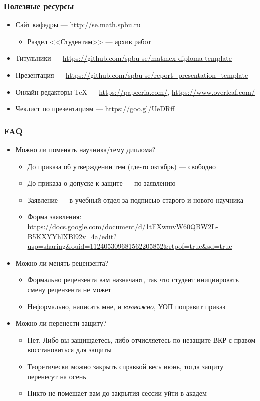 \documentclass[xetex,mathserif,serif]{beamer}
\begin{document}
    \begin{frame}
        \frametitle{Полезные ресурсы}
        \begin{itemize}
            \item Сайт кафедры --- \url{http://se.math.spbu.ru}
            \begin{itemize}
                \item Раздел <<Студентам>> --- архив работ
            \end{itemize}
            \item Титульники --- \url{https://github.com/spbu-se/matmex-diploma-template}
            \item Презентация --- \url{https://github.com/spbu-se/report_presentation_template}
            \item Онлайн-редакторы TeX --- \url{https://papeeria.com/}, \url{https://www.overleaf.com/}
            \item Чеклист по презентациям --- \url{https://goo.gl/UeDRff}
        \end{itemize}
    \end{frame}

    \begin{frame}
        \frametitle{FAQ}
        \begin{itemize}
            \item Можно ли поменять научника/тему диплома?
            \begin{itemize}
                \item До приказа об утверждении тем (где-то октябрь) --- свободно
                \item До приказа о допуске к защите --- по заявлению 
                \item Заявление --- в учебный отдел за подписью старого и нового научника 
                \item Форма заявления: \url{https://docs.google.com/document/d/1tFXwmvW60QBW2L-B5KXYYhlXBl92v_4a/edit?usp=sharing&ouid=112405309681562205852&rtpof=true&sd=true}
            \end{itemize}
            \item Можно ли менять рецензента?
            \begin{itemize}
                \item Формально рецензента вам назначают, так что студент инициировать смену рецензента не может
                \item Неформально, написать мне, и \textit{возможно}, УОП поправит приказ
            \end{itemize}
            \item Можно ли перенести защиту?
            \begin{itemize}
                \item Нет. Либо вы защищаетесь, либо отчисляетесь по незащите ВКР с правом восстановиться для защиты
                \item Теоретически можно закрыть справкой весь июнь, тогда защиту перенесут на осень
                \item Никто не помешает вам до закрытия сессии уйти в академ
            \end{itemize}
        \end{itemize}
    \end{frame}
\end{document}
